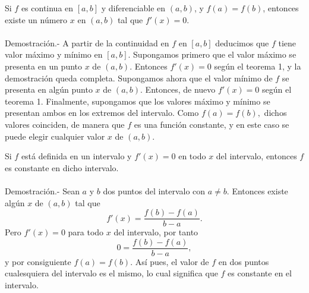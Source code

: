 \begin{teo}
    Si $f$ es continua en $[a,b]$ y diferenciable en $(a,b)$, y $f(a)=f(b)$, entonces existe un número $x$ en $(a,b)$ tal que $f'(x)=0$.\\\\
	Demostración.-\; A partir de la continuidad en $f$ en $[a,b]$ deducimos que $f$ tiene valor máximo y mínimo en $[a,b]$. Supongamos primero que el valor máximo se presenta en un punto $x$ de $(a,b)$. Entonces $f'(x)=0$ según el teorema 1, y la demostración queda completa. Supongamos ahora que el valor mínimo de $f$ se presenta en algún punto $x$ de $(a,b)$. Entonces, de nuevo $f'(x)=0$ según el teorema 1. Finalmente, supongamos que los valores máximo y mínimo se presentan ambos en los extremos del intervalo. Como $f(a)=f(b),$ dichos valores coinciden, de manera que $f$ es una función constante, y en este caso se puede elegir cualquier valor $x$ de $(a,b)$.
\end{teo}


\begin{cor}
    Si $f$ está definida en un intervalo y $f'(x)=0$ en todo $x$ del intervalo, entonces $f$ es constante en dicho intervalo.\\\\
	Demostración.-\; Sean $a$ y $b$ dos puntos del intervalo con $a\neq b$. Entonces existe algún $x$ de $(a,b)$ tal que 
	$$f'(x)=\dfrac{f(b)-f(a)}{b-a}.$$
	Pero $f'(x)=0$ para todo $x$ del intervalo, por tanto
	$$0=\dfrac{f(b)-f(a)}{b-a},$$
	y por consiguiente $f(a)=f(b)$. Así pues, el valor de $f$ en dos puntos cualesquiera del intervalo es el mismo, lo cual significa que $f$ es constante en el intervalo.\\\\
\end{cor}


